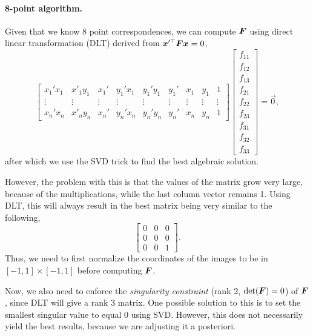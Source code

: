 \paragraph{8-point algorithm.}

Given that we know 8 point correspondences, we can compute $\bm{F}$ using
direct linear transformation (DLT) derived from
$\bm{x}'^\top\bm{F}\bm{x}=0$, \[
  \begin{bmatrix}
    x_1'x_1 & x'_1y_1 & x_1' & y_1'x_1 & y_1'y_1 & y_1' & x_1 & y_1 & 1 \\
    \vdots & \vdots & \vdots & \vdots & \vdots & \vdots & \vdots & \vdots & \vdots \\
    x_n'x_n & x'_ny_n & x_n' & y_n'x_n & y_n'y_n & y_n' & x_n & y_n & 1
  \end{bmatrix}
  \begin{bmatrix}
    f_{11} \\
    f_{12} \\
    f_{13} \\
    f_{21} \\
    f_{22} \\
    f_{23} \\
    f_{31} \\
    f_{32} \\
    f_{33}
  \end{bmatrix}
  = \vec{0}
,\]
after which we use the SVD trick to find the best algebraic solution.

However, the problem with this is that the values of the matrix grow very large,
because of the multiplications, while the last column vector remains 1. Using
DLT, this will always result in the best matrix being very similar to the
following, \[
  \begin{bmatrix}
    0 & 0 & 0 \\
    0 & 0 & 0 \\
    0 & 0 & 1
  \end{bmatrix}
.\]
Thus, we need to first normalize the coordinates of the images to be in $[-1,
1]\times[-1, 1]$ before computing $\bm{F}$.

Now, we also need to enforce the \textit{singularity constraint} (rank 2,
$\det{\mat{F}}=0$) of $\bm{F}$, since DLT will give a rank 3 matrix. One
possible solution to this is to set the smallest singular value to equal 0 using
SVD. However, this does not necessarily yield the best results, because we are
adjusting it a posteriori.

